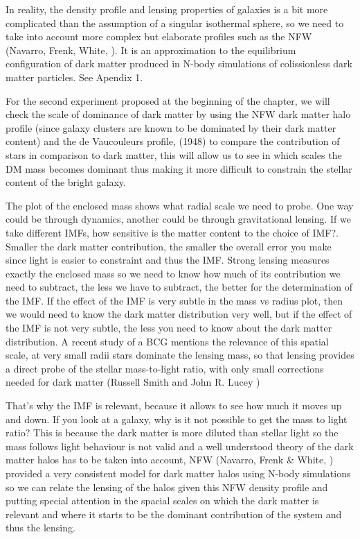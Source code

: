 In reality, the density profile and lensing properties of galaxies is a bit more complicated than the assumption of a singular isothermal sphere, so we need to take into account more complex but elaborate profiles such as the NFW (Navarro, Frenk, White, \citeyear{Reference17}). It is an approximation to the equilibrium configuration of dark matter produced in N-body simulations of colissionless dark matter particles. See Apendix 1.

For the second experiment proposed at the beginning of the chapter, we will check the scale of dominance of dark matter by using the NFW dark matter halo profile (since galaxy clusters are known to be dominated by their dark matter content) and the de Vaucouleurs profile, (1948) to compare the contribution of stars in comparison to dark matter, this will allow us to see in which scales the DM mass becomes dominant thus making it more difficult to constrain the stellar content of the bright galaxy.

The plot of the enclosed mass shows what radial scale we need to probe. One way could be through dynamics, another could be through gravitational lensing. If we take different IMFs, how sensitive is the matter content to the choice of IMF?. Smaller the dark matter contribution, the smaller the overall error you make since light is easier to constraint and thus the IMF. Strong lensing measures exactly the enclosed mass so we need to know how much of its contribution we need to subtract, the less we have to subtract, the better for the determination of the IMF. If the effect of the IMF is very subtle in the mass vs radius plot, then we would need to know the dark matter distribution very well, but if the effect of the IMF is not very subtle, the less you need to know about the dark matter distribution. A recent study of a BCG mentions the relevance of this spatial scale, at very small radii stars dominate the lensing mass, so that lensing provides a direct probe of the stellar mass-to-light ratio, with only small corrections needed for dark matter (Russell Smith and John R. Lucey \citeyear{Reference7}) 

That's why the IMF is relevant, because it allows to see how much it moves up and down. If you look at a galaxy, why is it not possible to get the mass to light ratio? This is because the dark matter is more diluted than stellar light so the mass follows light behaviour is not valid and a well understood theory of the dark matter halos has to be taken into account, NFW (Navarro, Frenk \& White, \citeyear{Reference17}) provided a very consistent model for dark matter halos using N-body simulations so we can relate the lensing of the halos given this NFW density profile and putting special attention in the spacial scales on which the dark matter is relevant and where it starts to be the dominant contribution of the system and thus the lensing.

